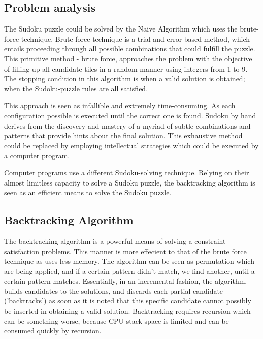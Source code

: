 \documentclass[12pt]{article}
\begin{document}
\subsection{Problem analysis}
\begin{flushleft}
The Sudoku puzzle could be solved by the Naive Algorithm which uses the brute-force technique. 
Brute-force technique is a trial and error based method, which entails proceeding through all possible combinations that could fulfill the puzzle. 
This primitive method - brute force, approaches the problem with the objective of filling up all candidate tiles in a random manner using integers from 1 to 9. The stopping condition in this algorithm is when a valid solution is obtained; when the Sudoku-puzzle rules are all satisfied. 

This approach is seen as infallible and extremely time-consuming. As each configuration possible is executed until the correct one is found. \newline
Sudoku by hand derives from the discovery and mastery of a myriad of subtle combinations and patterns that provide hints about the final solution.
This exhaustive method could be replaced by employing intellectual strategies which could be executed by a computer program. 
\newline

Computer programs use a different Sudoku-solving  technique. Relying on their almost limitless capacity to solve a Sudoku puzzle, the backtracking algorithm is seen as an efficient means to solve the Sudoku puzzle.



\end{flushleft}

\subsection{Backtracking Algorithm}
\begin{flushleft}
The backtracking algorithm is a powerful means of solving a constraint satisfaction problems. This manner is more effecient to that of the brute force technique as uses less memory.
The algorithm can be seen as permutation which are being applied, and if a certain pattern didn't match, we find another, until a certain pattern matches.
Essentially, in an incremental fashion, the algorithm, builds candidates to the solutions, and discards each partial candidate ('backtracks') as soon as it is noted that this specific candidate cannot possibly be inserted in obtaining a valid solution. 
Backtracking requires recursion which can be something worse, because CPU stack space is limited and can be consumed quickly by recursion.
\end{flushleft}
\end{document}
